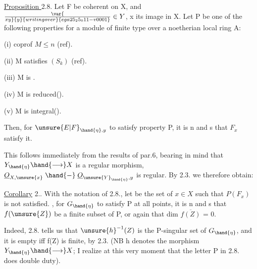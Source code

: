 
\uline{Proposition }2.8. Let F be coherent on X, and  $\var{\over{x}{y}}{y}{writing over}{ega25_25_011-v0001}\in Y$, x its image
in X.  Let P be one of the following properties for
a module of finite type  over a noetherian local ring A:

(i) coprof $M\leqslant n$ (ref).

(ii) M satisfies $(S_k)$ (ref).

(iii) M is .

(iv) M is reduced().

(v) M is integral().

Then, for $\unsure{E|F}_{\hand{\eta},y}$ to satisfy property P, it is n and s that $F_x$
satisfy it.

This follows immediately from the results of par.6, bearing in mind that
 $Y_{\hand{\eta}}\hand{\longrightarrow} X$ is a regular morphism,  $\underline{O}_{X,\unsure{x}}\mathrel{\hand{-}} \underline{O}_{\unsure{Y}_{\hand{\eta}},y}$ is
regular. By 2.3. we therefore obtain:

\uline{Corollary} 2.. With the notation of 2.8., let  be the set
of $x\in X$ such that $P(F_x)$ is not satisfied. , for
$G_{\hand{\eta}}$ to satisfy P at all points, it is n and s that $f(\unsure{Z})$ be a
finite subset of P, or again that  dim $\overline{f(Z)}$ = 0.

Indeed, 2.8. tells us that $\unsure{h}^{-1}(Z)$ is the P-singular set
of $G_{\hand{\eta}}$, and it is empty iff f(Z) is finite, by 2.3. (NB h denotes
 the morphism $Y_{\hand{\eta}}\hand{\longrightarrow} X$; I realize at this very moment that the letter P
 in 2.8. does double duty).

